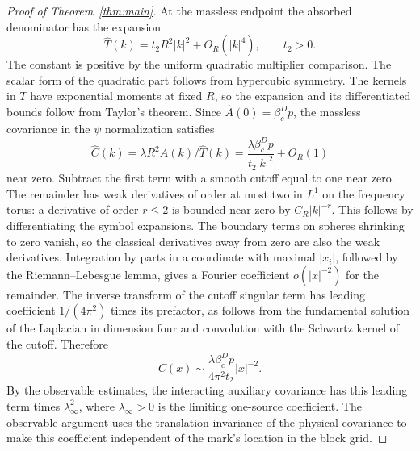 \documentclass[11pt]{article}
\begin{document}
\begin{proof}[Proof of Theorem~\ref{thm:main}]
At the massless endpoint the absorbed denominator has the
expansion
\[
 \widehat T(k)=t_2 R^2|k|^2+O_R(|k|^4),\qquad t_2>0.
\]
The constant is positive by the uniform quadratic multiplier
comparison. The scalar form of the quadratic part follows from
hypercubic symmetry. The kernels in \(T\) have exponential
moments at fixed \(R\), so the expansion and its differentiated
bounds follow from Taylor's theorem. Since \(\widehat A(0)=\beta_c^D p\),
the massless covariance in the \(\psi\) normalization satisfies
\[
 \widehat C(k)=\lambda R^2\widehat A(k)/\widehat T(k)
       =\frac{\lambda\beta_c^D p}{t_2|k|^2}+O_R(1)
\]
near zero. Subtract the first term with a smooth cutoff
equal to one near zero. The remainder has weak derivatives
of order at most two in \(L^1\) on the frequency torus:
a derivative of order \(r\le2\) is bounded near zero by
\(C_R|k|^{-r}\). This follows by differentiating the symbol
expansions. The boundary terms on spheres shrinking to zero
vanish, so the classical derivatives away from zero are
also the weak derivatives. Integration by parts in a coordinate
with maximal \(|x_i|\), followed by the Riemann--Lebesgue
lemma, gives a Fourier coefficient \(o(|x|^{-2})\) for the
remainder. The inverse transform of the cutoff singular term
has leading coefficient \(1/(4\pi^2)\) times its prefactor,
as follows from the fundamental solution of the Laplacian
in dimension four and convolution with the Schwartz kernel
of the cutoff. Therefore
\[
 C(x)\sim \frac{\lambda\beta_c^D p}{4\pi^2 t_2}|x|^{-2}.
\]
By the observable estimates, the interacting auxiliary
covariance has this leading term times \(\lambda_\infty^2\),
where \(\lambda_\infty>0\) is the limiting one-source
coefficient. The observable argument uses the translation
invariance of the physical covariance to make this coefficient
independent of the mark's location in the block grid.


\end{proof}
\end{document}
